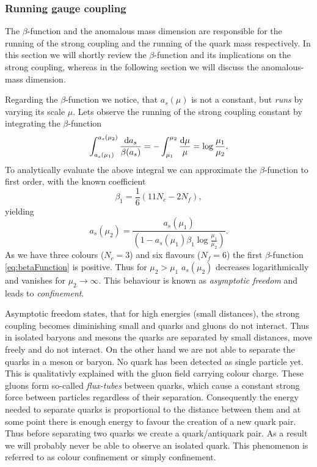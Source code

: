 \documentclass[../../index.tex]{subfiles}
\begin{document}
\subsubsection{Running gauge coupling}
The $\beta$-function and the anomalous mass dimension are responsible for the
running of the strong coupling and the running of the quark mass respectively.
In this section we will shortly review the $\beta$-function and its implications
on the strong coupling, whereas in the following section we will discuss the
anomalous-mass dimension.

Regarding the $\beta$-function we notice, that $a_s(\mu)$ is not a constant, but
\textit{runs} by varying its scale $\mu$. Lets observe the running of the strong
coupling constant by integrating the $\beta$-function
\begin{equation}
  \int_{a_s(\mu_1)}^{a_s(\mu_2)}\frac{\dif a_s}{\beta(a_s)} = - \int_{\mu_1}^{\mu_2} \frac{\dif \mu}{\mu} = \log \frac{\mu_1}{\mu_2}.
\end{equation}
To analytically evaluate the above integral we can approximate the
$\beta$-function to first order, with the known coefficient
\begin{equation}
  \label{eq:firstBetaCoefficient}
  \beta_1 = \frac{1}{6}(11 N_c - 2 N_f),
\end{equation}
yielding
\begin{equation}
  a_s(\mu_2) = \frac{a_s(\mu_1)}{\left( 1 - a_s(\mu_1) \beta_1 \log\frac{\mu_1}{\mu_2} \right)}.
\end{equation}
As we have three colours ($N_c=3$) and six flavours ($N_f=6$) the first
$\beta$-function \ref{eq:betaFunction} is positive. Thus for $\mu_2>\mu_1$
$a_s(\mu_2)$ decreases logarithmically and vanishes for $\mu_2 \to \infty$. This
behaviour is known as \textit{asymptotic freedom} and leads to
\textit{confinement}.

Asymptotic freedom states, that for high energies (small distances), the strong
coupling becomes diminishing small and quarks and gluons do not interact. Thus
in isolated baryons and mesons the quarks are separated by small distances, move
freely and do not interact. On the other hand we are not able to separate the
quarks in a meson or baryon. No quark has been detected as single particle yet.
This is qualitativly explained with the gluon field carrying colour charge.
These gluons form so-called \textit{flux-tubes} between quarks, which cause a
constant strong force between particles regardless of their separation.
Consequently the energy needed to separate quarks is proportional to the
distance between them and at some point there is enough energy to favour the
creation of a new quark pair. Thus before separating two quarks we create a
quark\-/antiquark pair. As a result we will probably never be able to observe an
isolated quark. This phenomenon is referred to as colour confinement or simply
confinement.
\end{document}
